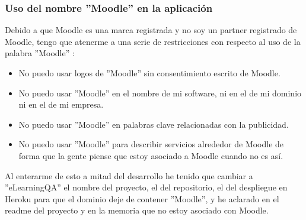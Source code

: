 \subsubsection{Uso del nombre ''Moodle'' en la aplicación}
Debido a que Moodle es una marca registrada y no soy un partner registrado de Moodle, tengo que atenerme a una serie de restricciones con respecto al uso de la palabra ''Moodle'' \cite{moodletrademark-2022}:
\begin{itemize}
	\item No puedo usar logos de ''Moodle'' sin consentimiento escrito de Moodle.
	\item No puedo usar ''Moodle'' en el nombre de mi software, ni en el de mi dominio ni en el de mi empresa.
	\item No puedo usar ''Moodle'' en palabras clave relacionadas con la publicidad.
	\item No puedo usar ''Moodle'' para describir servicios alrededor de Moodle de forma que la gente piense que estoy asociado a Moodle cuando no es así.
\end{itemize}

Al enterarme de esto a mitad del desarrollo he tenido que cambiar a ''eLearningQA'' el nombre del proyecto, el del repositorio, el del despliegue en Heroku para que el dominio deje de contener ''Moodle'', y he aclarado en el readme del proyecto y en la memoria que no estoy asociado con Moodle.
